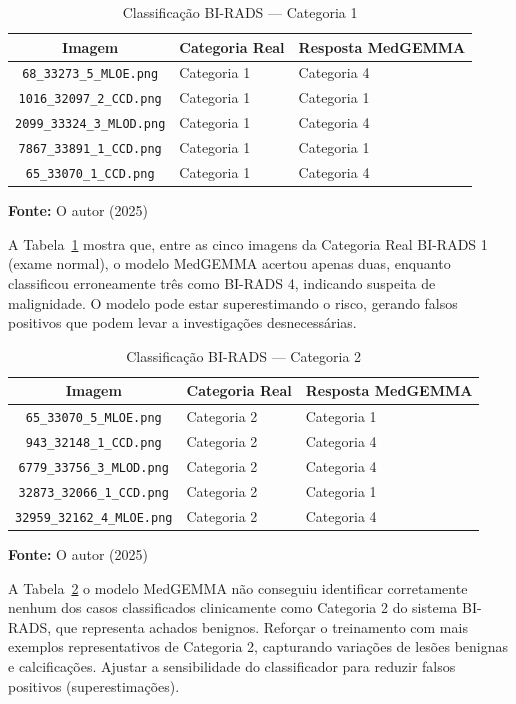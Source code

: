 \documentclass[10pt,conference]{IEEEtran}
\begin{document}
\begin{table}[!h]
\renewcommand{\arraystretch}{1.3}
\caption{Classificação BI-RADS — Categoria 1}
\label{table:birads_categoria1}
\centering
\begin{tabular}{|c|l|p{2.5cm}|}
\hline
\textbf{Imagem} & \textbf{Categoria Real} & \textbf{Resposta MedGEMMA} \\
\hline
\texttt{68\_33273\_5\_MLOE.png} & Categoria 1 & Categoria 4 \\
\hline
\texttt{1016\_32097\_2\_CCD.png} & Categoria 1 & Categoria 1 \\
\hline
\texttt{2099\_33324\_3\_MLOD.png} & Categoria 1 & Categoria 4 \\
\hline
\texttt{7867\_33891\_1\_CCD.png} & Categoria 1 & Categoria 1 \\
\hline
\texttt{65\_33070\_1\_CCD.png} & Categoria 1 & Categoria 4 \\
\hline
\end{tabular}

\vspace{0.2cm}
\small \textbf{Fonte:} O autor (2025)
\end{table}

A Tabela~\ref{table:birads_categoria1} mostra que, entre as cinco imagens da Categoria Real BI-RADS 1 (exame normal), o modelo MedGEMMA acertou apenas duas, enquanto classificou erroneamente três como BI-RADS 4, indicando suspeita de malignidade. O modelo pode estar superestimando o risco, gerando falsos positivos que podem levar a investigações desnecessárias. 

\begin{table}[!h]
\renewcommand{\arraystretch}{1.3}
\caption{Classificação BI-RADS — Categoria 2}
\label{table:birads_categoria2}
\centering
\begin{tabular}{|c|l|p{2.5cm}|}
\hline
\textbf{Imagem} & \textbf{Categoria Real} & \textbf{Resposta MedGEMMA} \\
\hline
\texttt{65\_33070\_5\_MLOE.png} & Categoria 2 & Categoria 1 \\
\hline
\texttt{943\_32148\_1\_CCD.png} & Categoria 2 & Categoria 4 \\
\hline
\texttt{6779\_33756\_3\_MLOD.png} & Categoria 2 & Categoria 4 \\
\hline
\texttt{32873\_32066\_1\_CCD.png} & Categoria 2 & Categoria 1 \\
\hline
\texttt{32959\_32162\_4\_MLOE.png} & Categoria 2 & Categoria 4 \\
\hline
\end{tabular}

\vspace{0.2cm}
\small \textbf{Fonte:} O autor (2025)
\end{table}
A Tabela~\ref{table:birads_categoria2} o modelo MedGEMMA não conseguiu identificar corretamente nenhum dos casos classificados clinicamente como Categoria 2 do sistema BI-RADS, que representa achados benignos. Reforçar o treinamento com mais exemplos representativos de Categoria 2, capturando variações de lesões benignas e calcificações. 
Ajustar a sensibilidade do classificador para reduzir falsos positivos (superestimações).
\end{document}
